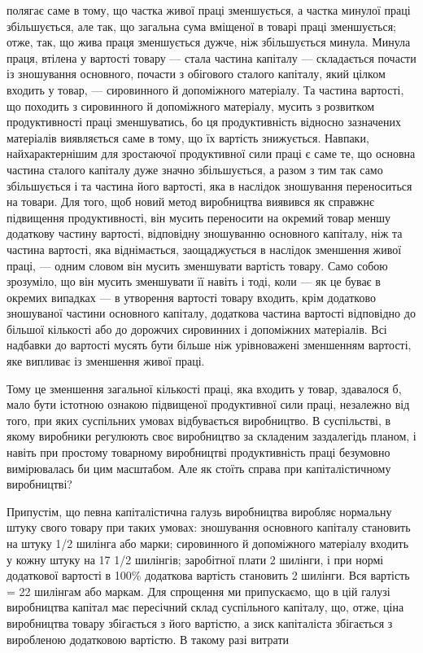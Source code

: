 полягає саме в тому, що частка живої праці зменшується,
а частка минулої праці збільшується, але так, що загальна сума
вміщеної в товарі праці зменшується; отже, так, що жива праця
зменшується дужче, ніж збільшується минула. Минула праця,
втілена у вартості товару — стала частина капіталу — складається
почасти із зношування основного, почасти з обігового
сталого капіталу, який цілком входить у товар, — сировинного
й допоміжного матеріалу. Та частина вартості, що походить
з сировинного й допоміжного матеріалу, мусить з розвитком
продуктивності праці зменшуватись, бо ця продуктивність відносно
зазначених матеріалів виявляється саме в тому, що їх вартість
знижується. Навпаки, найхарактернішим для зростаючої
продуктивної сили праці є саме те, що основна частина сталого
капіталу дуже значно збільшується, а разом з тим так само
збільшується і та частина його вартості, яка в наслідок зношування
переноситься на товари. Для того, щоб новий метод
виробництва виявився як справжнє підвищення продуктивності,
він мусить переносити на окремий товар меншу додаткову частину
вартості, відповідну зношуванню основного капіталу,
ніж та частина вартості, яка віднімається, заощаджується в наслідок
зменшення живої праці, — одним словом він мусить зменшувати
вартість товару. Само собою зрозуміло, що він мусить
зменшувати її навіть і тоді, коли — як це буває в окремих випадках
— в утворення вартості товару входить, крім додатково зношуваної
частини основного капіталу, додаткова частина вартості
відповідно до більшої кількості або до дорожчих сировинних і
допоміжних матеріалів. Всі надбавки до вартості мусять бути
більше ніж урівноважені зменшенням вартості, яке випливає із
зменшення живої праці.

Тому це зменшення загальної кількості праці, яка входить
у товар, здавалося б, мало бути істотною ознакою підвищеної
продуктивної сили праці, незалежно від того, при яких суспільних
умовах відбувається виробництво. В суспільстві, в якому
виробники регулюють своє виробництво за складеним заздалегідь
планом, і навіть при простому товарному виробництві продуктивність
праці безумовно вимірювалась би цим масштабом.
Але як стоїть справа при капіталістичному виробництві?

Припустім, що певна капіталістична галузь виробництва
виробляє нормальну штуку свого товару при таких умовах: зношування
основного капіталу становить на штуку 1/2 шилінга або
марки; сировинного й допоміжного матеріалу входить у кожну
штуку на 17 1/2 шилінгів; заробітної плати 2 шилінги, і при нормі
додаткової вартості в 100\% додаткова вартість становить 2 шилінги.
Вся вартість = 22 шилінгам або маркам. Для спрощення
ми припускаємо, що в цій галузі виробництва капітал має пересічний
склад суспільного капіталу, що, отже, ціна виробництва
товару збігається з його вартістю, а зиск капіталіста збігається
з виробленою додатковою вартістю. В такому разі витрати
